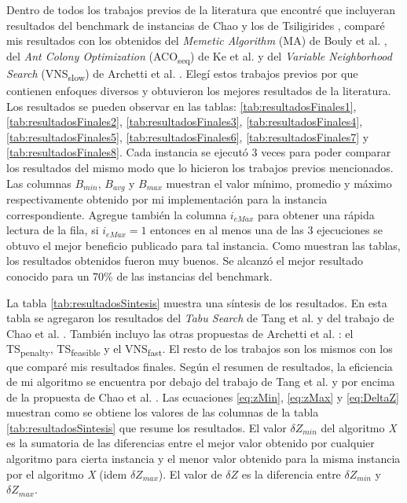 Dentro de todos los trabajos previos de la literatura que encontré que incluyeran resultados del benchmark de instancias de Chao y los de Tsiligirides \cite{IntancesChaoTsiligirides}, comparé mis resultados con los obtenidos del \textit{Memetic Algorithm} (MA) de Bouly et al. \cite{BoulyDangMoukrim}, del \textit{Ant Colony Optimization} (ACO\textsubscript{seq}) de Ke et al. \cite{KeArchettiFeng} y del \textit{Variable Neighborhood Search} (VNS\textsubscript{slow}) de Archetti et al. \cite{ArchettiHertzSperanza}. Elegí estos trabajos previos por que contienen enfoques diversos y obtuvieron los mejores resultados de la literatura. Los resultados se pueden observar en las tablas: \ref{tab:resultadosFinales1}, \ref{tab:resultadosFinales2}, \ref{tab:resultadosFinales3}, \ref{tab:resultadosFinales4}, \ref{tab:resultadosFinales5}, \ref{tab:resultadosFinales6}, \ref{tab:resultadosFinales7} y \ref{tab:resultadosFinales8}. Cada instancia se ejecutó 3 veces para poder comparar los resultados del mismo modo que lo hicieron los trabajos previos mencionados. Las columnas $B_{min}$, $B_{avg}$ y $B_{max}$ muestran el valor mínimo, promedio y máximo respectivamente obtenido por mi implementación para la instancia correspondiente. Agregue también la columna $i_{eMax}$ para obtener una rápida lectura de la fila, si $i_{eMax} = 1$ entonces en al menos una de las 3 ejecuciones se obtuvo el mejor beneficio publicado para tal instancia. Como muestran las tablas, los resultados obtenidos fueron muy buenos. Se alcanzó el mejor resultado conocido para un 70\% de las instancias del benchmark.

\bigskip

La tabla \ref{tab:resultadosSintesis} muestra una síntesis de los resultados. En esta tabla se agregaron los resultados del \textit{Tabu Search} de Tang et al. \cite{TangMillerHooks} y del trabajo de Chao et al. \cite{ChaoGoldenWasil}. También incluyo las otras propuestas de Archetti et al. \cite{ArchettiHertzSperanza}: el TS\textsubscript{penalty}, TS\textsubscript{feasible} y el VNS\textsubscript{fast}. El resto de los trabajos son los mismos con los que comparé mis resultados finales. Según el resumen de resultados, la eficiencia de mi algoritmo se encuentra por debajo del trabajo de Tang et al. \cite{TangMillerHooks} y por encima de la propuesta de Chao et al. \cite{ChaoGoldenWasil}. Las ecuaciones \ref{eq:zMin}, \ref{eq:zMax} y \ref{eq:DeltaZ} muestran como se obtiene los valores de las columnas de la tabla \ref{tab:resultadosSintesis} que resume los resultados. El valor $\delta Z_{min}$ del algoritmo \textit{X} es la sumatoria de las diferencias entre el mejor valor obtenido por cualquier algoritmo para cierta instancia y el menor valor obtenido para la misma instancia por el algoritmo \textit{X} (idem $\delta Z_{max}$). El valor de $\delta Z$ es la diferencia entre $\delta Z_{min}$ y $\delta Z_{max}$.


